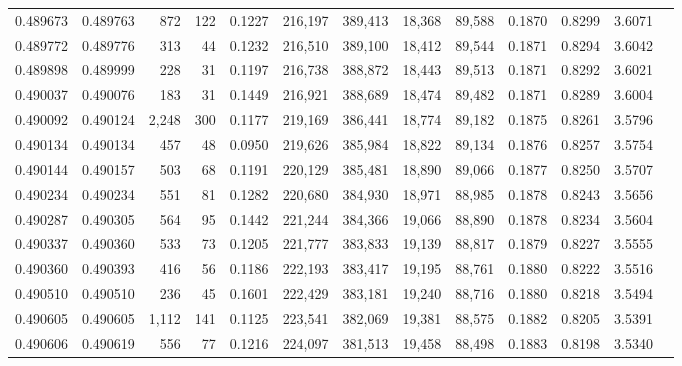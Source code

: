 \begin{tabular}{rrrrrrrrrrrrr}
0.489673 & 0.489763 &   872 &   122 &                                     0.1227 & 216,197 & 389,413 &  18,368 &  89,588 & 0.1870 & 0.8299 & 3.6071 \\
0.489772 & 0.489776 &   313 &    44 &                                     0.1232 & 216,510 & 389,100 &  18,412 &  89,544 & 0.1871 & 0.8294 & 3.6042 \\
0.489898 & 0.489999 &   228 &    31 &                                     0.1197 & 216,738 & 388,872 &  18,443 &  89,513 & 0.1871 & 0.8292 & 3.6021 \\
0.490037 & 0.490076 &   183 &    31 &                                     0.1449 & 216,921 & 388,689 &  18,474 &  89,482 & 0.1871 & 0.8289 & 3.6004 \\
0.490092 & 0.490124 & 2,248 &   300 &                                     0.1177 & 219,169 & 386,441 &  18,774 &  89,182 & 0.1875 & 0.8261 & 3.5796 \\
0.490134 & 0.490134 &   457 &    48 &                                     0.0950 & 219,626 & 385,984 &  18,822 &  89,134 & 0.1876 & 0.8257 & 3.5754 \\
0.490144 & 0.490157 &   503 &    68 &                                     0.1191 & 220,129 & 385,481 &  18,890 &  89,066 & 0.1877 & 0.8250 & 3.5707 \\
0.490234 & 0.490234 &   551 &    81 &                                     0.1282 & 220,680 & 384,930 &  18,971 &  88,985 & 0.1878 & 0.8243 & 3.5656 \\
0.490287 & 0.490305 &   564 &    95 &                                     0.1442 & 221,244 & 384,366 &  19,066 &  88,890 & 0.1878 & 0.8234 & 3.5604 \\
0.490337 & 0.490360 &   533 &    73 &                                     0.1205 & 221,777 & 383,833 &  19,139 &  88,817 & 0.1879 & 0.8227 & 3.5555 \\
0.490360 & 0.490393 &   416 &    56 &                                     0.1186 & 222,193 & 383,417 &  19,195 &  88,761 & 0.1880 & 0.8222 & 3.5516 \\
0.490510 & 0.490510 &   236 &    45 &                                     0.1601 & 222,429 & 383,181 &  19,240 &  88,716 & 0.1880 & 0.8218 & 3.5494 \\
0.490605 & 0.490605 & 1,112 &   141 &                                     0.1125 & 223,541 & 382,069 &  19,381 &  88,575 & 0.1882 & 0.8205 & 3.5391 \\
0.490606 & 0.490619 &   556 &    77 &                                     0.1216 & 224,097 & 381,513 &  19,458 &  88,498 & 0.1883 & 0.8198 & 3.5340 \\

\end{tabular}
